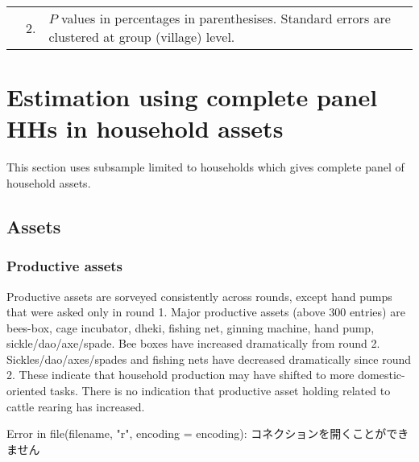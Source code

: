\begin{minipage}[t]{14cm}
\begin{tabular}{>{\hfill\scriptsize}p{1cm}<{}>{\hfill\scriptsize}p{.25cm}<{}>{\scriptsize}p{12cm}<{\hfill}}
& 2. & $P$ values in percentages in parenthesises. Standard errors are clustered at group (village) level.
\end{tabular}
\end{minipage}





\section{Estimation using complete panel HHs in household assets}


This section uses subsample limited to households which gives complete panel of household assets. 

\subsection{Assets}

\subsubsection{Productive assets}


Productive assets are sorveyed consistently across rounds, except hand pumps that were asked only in round 1. Major productive assets (above 300 entries) are bees-box, cage incubator, dheki, fishing net, ginning machine, hand pump, sickle/dao/axe/spade. Bee boxes have increased dramatically from round 2. Sickles/dao/axes/spades and fishing nets have decreased dramatically since round 2. These indicate that household production may have shifted to more domestic-oriented tasks. There is no indication that productive asset holding related to cattle rearing has increased.


\begin{Schunk}
\begin{Soutput}
Error in file(filename, "r", encoding = encoding): コネクションを開くことができません
\end{Soutput}
\end{Schunk}




